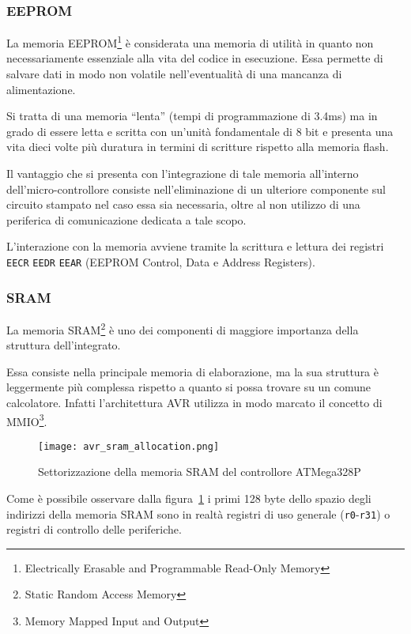 \subsubsection{EEPROM}

La memoria EEPROM\footnote{Electrically Erasable and Programmable Read-Only Memory} è considerata una memoria di utilità in quanto non necessariamente essenziale alla vita del codice in esecuzione. Essa permette di salvare dati in modo non volatile nell'eventualità di una mancanza di alimentazione.

Si tratta di una memoria ``lenta'' (tempi di programmazione di 3.4ms\cite[tab 8-1]{avr:m328p}) ma in grado di essere letta e scritta con un'unità fondamentale di 8 bit\cite[sec 8.4]{avr:m328p} e presenta una vita dieci volte più duratura in termini di scritture rispetto alla memoria flash.

Il vantaggio che si presenta con l'integrazione di tale memoria all'interno dell'micro-controllore consiste nell'eliminazione di un ulteriore componente sul circuito stampato nel caso essa sia necessaria, oltre al non utilizzo di una periferica di comunicazione dedicata a tale scopo.

L'interazione con la memoria avviene tramite la scrittura e lettura dei registri \texttt{EECR} \texttt{EEDR} \texttt{EEAR} (EEPROM Control, Data e Address Registers)\cite[34]{avr:m328p}.

\subsubsection{SRAM}
La memoria SRAM\footnote{Static Random Access Memory} è uno dei componenti di maggiore importanza della struttura dell'integrato.

Essa consiste nella principale memoria di elaborazione, ma la sua struttura è leggermente più complessa rispetto a quanto si possa trovare su un comune calcolatore.
Infatti l'architettura AVR utilizza in modo marcato il concetto di MMIO\footnote{Memory Mapped Input and Output}.

\begin{figure}[b]
    \centering
    \texttt{[image: avr\_sram\_allocation.png]}
    \caption[Immagine ottenuta dal documento~\cite{avr:m328p}, fig. 8-3]{Settorizzazione della memoria SRAM del controllore ATMega328P\cite[fig 8-3]{avr:m328p}}\label{fig:avr-sram-alloc}
\end{figure}

Come è possibile osservare dalla figura~\ref{fig:avr-sram-alloc} i primi 128 byte dello spazio degli indirizzi della memoria SRAM sono in realtà registri di uso generale (\texttt{r0}-\texttt{r31}) o registri di controllo delle periferiche.

